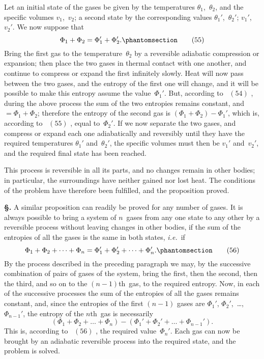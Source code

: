 \documentclass[12pt]{book}[2005/09/16]
\newcommand{\Chg}[2]{#2}
\newcommand{\Add}[1]{\Chg{}{#1}}
\newcommand{\Section}[1]{
  \medskip\par\textbf{§\;#1}
  \label{section:#1}
}
\newcommand{\Tag}[1]{%
  \phantomsection\label{eqn:#1}\tag*{\ensuremath{#1}}%
}
\newcommand{\Eq}[1]{%
  \hyperref[eqn:#1]{\ensuremath{#1}}%
}
\newcommand{\PageSep}[1]{\ignorespaces}
\newcommand{\ie}{\emph{i.e.}}
\begin{document}
Let an initial state of the gases be given by the temperatures
$\theta_{1}$,~$\theta_{2}$, and the specific volumes $v_{1}$,~$v_{2}$; a second state
by the corresponding values $\theta_{1}'$,~$\theta_{2}'$; $v_{1}'$,~$v_{2}'$. We now
suppose that
\[
\Phi_{1} + \Phi_{2} = \Phi_{1}' + \Phi_{2}'\Add{.}
\Tag{(55)}
\]
Bring the first gas to the temperature~$\theta_{2}$ by a reversible
adiabatic compression or expansion; then place the two gases
in thermal contact with one another, and continue to compress
or expand the first infinitely slowly. Heat will now pass
between the two gases, and the entropy of the first one will
change, and it will be possible to make this entropy assume
the value~$\Phi_{1}'$. But, according to~\Eq{(54)}, during the above
process the sum of the two entropies remains constant, and
$= \Phi_{1} + \Phi_{2}$; therefore the entropy of the second gas is
$(\Phi_{1} + \Phi_{2}) - \Phi_{1}'$, which is, according to~\Eq{(55)}, equal to~$\Phi_{2}'$. If
we now separate the two gases, and compress or expand
each one adiabatically and reversibly until they have the
required temperatures $\theta_{1}'$ and~$\theta_{2}'$, the specific volumes must
then be $v_{1}'$ and~$v_{2}'$, and the required final state has been
reached.

This process is reversible in all its parts, and no changes
remain in other bodies; in particular, the surroundings
have neither gained nor lost heat. The conditions of the
problem have therefore been fulfilled, and the proposition
proved.

\Section{123.} A similar proposition can readily be proved for
any number of gases. It is always possible to bring a
system of $n$~gases from any one state to any other by
a reversible process without leaving changes in other bodies,
if the sum of the entropies of all the gases is the same in
both states, \ie\ if
\[
\Phi_{1} + \Phi_{2} + \dots + \Phi_{n} = \Phi_{1}' + \Phi_{2}' + \dots + \Phi_{n}'.
\Tag{(56)}
\]
\PageSep{92}
%
By the process described in the preceding paragraph we
may, by the successive combination of pairs of gases of the
system, bring the first, then the second, then the third, and
so on to the $(n - 1)$th~gas, to the required entropy. Now,
%
in each of the successive processes the sum of the entropies
of all the gases remains constant, and, since the entropies of
the first $(n - 1)$ gases are $\Phi_{1}'$, $\Phi_{2}'$\Add{,}~\dots\Add{,} $\Phi_{n-1}'$, the entropy of
the $n$th~gas is necessarily
\[
(\Phi_{1} + \Phi_{2} + \dots + \Phi_{n}) - (\Phi_{1}' + \Phi_{2}' + \dots + \Phi_{n-1}').
\]
This is, according to~\Eq{(56)}, the required value~$\Phi_{n}'$. Each gas
can now be brought by an adiabatic reversible process into
the required state, and the problem is solved.
\end{document}
